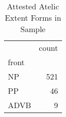 \begin{table}[htbp!]
\centering
\caption{Attested Atelic Extent Forms in Sample}
\label{table:atel_phtype}
\begin{tabular}{lr}
\toprule
{} &  count \\
front &        \\
\midrule
NP    &    521 \\
PP    &     46 \\
ADVB  &      9 \\
\bottomrule
\end{tabular}
\end{table}
